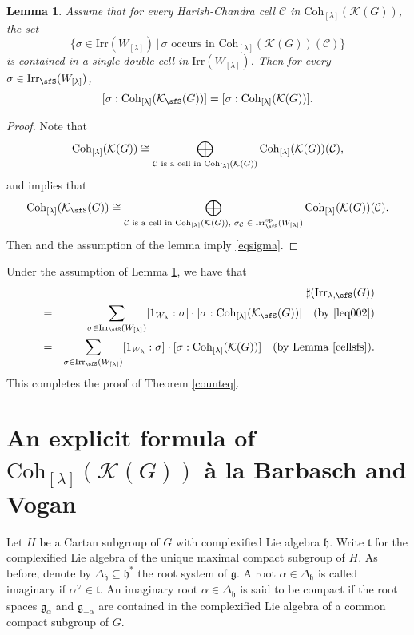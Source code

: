 \documentclass[12pt,a4paper]{amsart}
\def\subset{\subseteq}
\newcommand{\CC}{{\mathcal {C}}}
\newcommand{\CK}{{\mathcal {K}}}
\newcommand{\g}{\mathfrak g}
\newcommand{\h}{\mathfrak h}
\renewcommand{\t}{\mathfrak t}
\newcommand{\be}{\begin {equation}}
\newcommand{\ee}{\end {equation}}
\numberwithin{equation}{section}
\newtheorem{lem}[thm]{Lemma}
\theoremstyle{remark}
\def\Irr{\mathrm{Irr}}
\def\Coh{\mathrm{Coh}}
\newcommand{\Lam}{{[\lambda]}}
\begin{document}
\begin{lem}\label{cellsfs}
Assume that for every Harish-Chandra cell $\CC$ in $\Coh_{\Lam}(\CK(G))$, the set
\[
\{\sigma\in \Irr(W_{[\lambda]})\,|\, \textrm{$\sigma$ occurs in $\Coh_{\Lam}(\CK(G))(\CC)$}\}
\]
is contained in a single double cell in $\Irr(W_\Lam)$. Then for every $\sigma\in \Irr_\sfS(W_\Lam)$,
\be\label{eqsigma}
[ \sigma: \Coh_{\Lam}(\CK_\sfS(G))]=[\sigma:\Coh_{\Lam}(\CK(G))].
\ee
\end{lem}
\begin{proof}
Note that
\[
  \Coh_{\Lam}(\CK(G))\\
   \cong \bigoplus_{\CC \textrm{ is a cell in $\Coh_{\Lam}(\CK(G))$}} \Coh_{\Lam}(\CK(G))(\CC),
\]
and
 implies that
 \[
   \Coh_{\Lam}(\CK_\sfS(G))\cong  \bigoplus_{\CC \textrm{ is a cell in $\Coh_{\Lam}(\CK(G))$, $\sigma_\CC\in \Irr^{\mathrm{sp}}_\sfS(W_\Lam)$}} \Coh_{\Lam}(\CK(G))(\CC).
 \]
Then   and the assumption of the lemma imply \eqref{eqsigma}. \end{proof}

Under the assumption of Lemma \ref{cellsfs}, we have that
\begin{eqnarray*}
   && \sharp(\Irr_{\lambda,\sfS}(G)) \\
   &=&  \sum_{\sigma \in \Irr_\sfS(W_\Lam)} [1_{W_{\lambda}}: \sigma]\cdot [\sigma:\Coh_{\Lam}(\CK_\sfS(G))]   \quad (\textrm{by \eqref{leq002}})\\
    &= & \sum_{\sigma \in \Irr_\sfS(W_\Lam)} [1_{W_{\lambda}}: \sigma]\cdot [\sigma:\Coh_{\Lam}(\CK(G))]   \quad (\textrm{by Lemma \ref{cellsfs}}).\\
\end{eqnarray*}
This completes the proof of Theorem \ref{counteq}.

\section{An explicit formula of $\Coh_{\Lam}(\CK(G))$ \`a la Barbasch and Vogan}

 Let $H$ be a  Cartan subgroup of $G$ with complexified Lie algebra $\h$. Write $\t$ for the complexified Lie algebra of the unique maximal compact subgroup of $H$. As before, denote by $\Delta_\h\subset \h^*$ the root system of $\g$. A root $\alpha\in \Delta_\h$ is called imaginary if $\alpha^\vee\in \t$. An imaginary root $\alpha\in \Delta_\h$ is said to be compact if the root spaces $\g_\alpha$ and $\g_{-\alpha}$ are contained in  the  complexified Lie algebra of a common compact subgroup of $G$.
\end{document}
